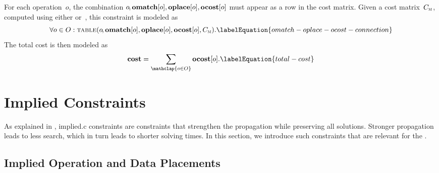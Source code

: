 For each \gls{operation}~$o$\hspace{-.8pt}, the combination
\mbox{$o\hspace{-.8pt}, \mVar{omatch}[o], \mVar{oplace}[o], \mVar{ocost}[o]$}
must appear as a row in the cost matrix.
%
Given a cost matrix~$C_{\textsc{m}}$, computed using either
 or~, this
\gls{constraint} is modeled as
%
\begin{equation}
  \forall o \in \mOpSet :
  \mTable(
    o\hspace{-1pt},
    \mVar{omatch}[o],
    \mVar{oplace}[o],
    \mVar{ocost}[o],
    \mCostMatrix
  ).
  \labelEquation{omatch-oplace-ocost-connection}
\end{equation}
%
The total cost is then modeled as
%
\begin{equation}
  \mVar{cost} = \sum_{\mathclap{o \in \mOpSet}} \mVar{ocost}[o].
  \labelEquation{total-cost}
\end{equation}


\section{Implied Constraints}

As explained in , \gls{implied.c}
\glspl{constraint} are \glspl{constraint} that strengthen the \gls{propagation}
while preserving all \glspl{solution}.
%
Stronger \gls{propagation} leads to less \gls{search}, which in turn leads to
shorter solving times.
%
In this section, we introduce such \glspl{constraint} that are relevant for the
.


\subsection{Implied Operation and Data Placements}

